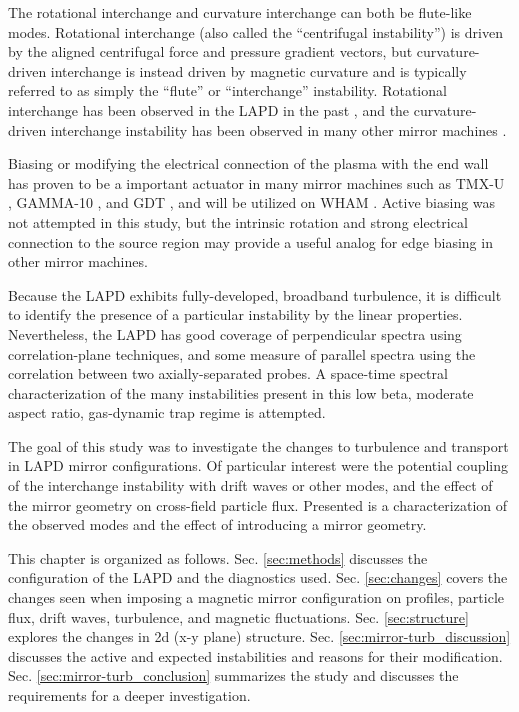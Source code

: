The rotational interchange and curvature interchange can both be flute-like modes. Rotational interchange (also called the ``centrifugal instability'') is driven by the aligned centrifugal force and pressure gradient vectors, but curvature-driven interchange is instead driven by magnetic curvature and is typically referred to as simply the ``flute'' or ``interchange'' instability. Rotational interchange \cite{Jassby_transverse_1972} has been observed in the LAPD in the past \cite{Schaffner_2012, Schaffner_2013}, and the curvature-driven interchange instability has been observed in many other mirror machines \cite{wickham_curvature-induced_1982, ferron_interchange_1983, Post_1987}. 

Biasing or modifying the electrical connection of the plasma with the end wall has proven to be a important actuator in many mirror machines such as TMX-U \cite{Hooper_1984}, GAMMA-10 \cite{Mase_1991}, and GDT \cite{Bagryansky_2003, Bagryansky_2007, Beklemishev_2010}, and will be utilized on WHAM \cite{WHAM}. Active biasing was not attempted in this study, but the intrinsic rotation and strong electrical connection to the source region may provide a useful analog for edge biasing in other mirror machines.

Because the LAPD exhibits fully-developed, broadband turbulence, it is difficult to identify the presence of a particular instability by the linear properties.  
Nevertheless, the LAPD has good coverage of perpendicular spectra using correlation-plane techniques, and some measure of parallel spectra using the correlation between two axially-separated probes. A space-time spectral characterization of the many instabilities present in this low beta, moderate aspect ratio, gas-dynamic trap regime is attempted.

The goal of this study was to investigate the changes to turbulence and transport in LAPD mirror configurations. Of particular interest were the potential coupling of the interchange instability with drift waves or other modes, and the effect of the mirror geometry on cross-field particle flux. Presented is a characterization of the observed modes and the effect of introducing a mirror geometry.

This chapter is organized as follows. Sec. \ref{sec:methods} discusses the configuration of the LAPD and the diagnostics used. Sec. \ref{sec:changes} covers the changes seen when imposing a magnetic mirror configuration on profiles, particle flux, drift waves, turbulence, and magnetic fluctuations. Sec. \ref{sec:structure} explores the changes in 2d (x-y plane) structure. Sec. \ref{sec:mirror-turb_discussion} discusses the active and expected instabilities and reasons for their modification. Sec. \ref{sec:mirror-turb_conclusion} summarizes the study and discusses the requirements for a deeper investigation.

